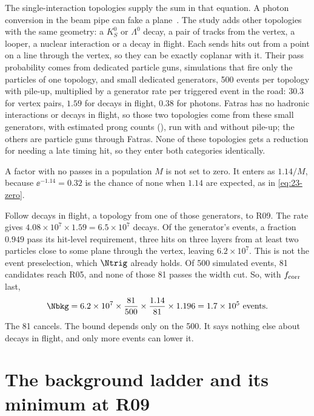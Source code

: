 The single-interaction topologies supply the sum in that equation. A photon conversion in the beam pipe can fake a plane~\cite{Knapen:2017kly}. The study adds other topologies with the same geometry: a $K^0_S$ or $\Lambda^0$ decay, a pair of tracks from the vertex, a looper, a nuclear interaction or a decay in flight. Each sends hits out from a point on a line through the vertex, so they can be exactly coplanar with it. Their pass probability comes from dedicated particle guns, simulations that fire only the particles of one topology, and small dedicated generators, 500 events per topology with pile-up, multiplied by a generator rate per triggered event in the road: $30.3$ for vertex pairs, $1.59$ for decays in flight, $0.38$ for photons. Fatras has no hadronic interactions or decays in flight, so those two topologies come from these small generators, with estimated prong counts (\EST), run with and without pile-up; the others are particle guns through Fatras. None of these topologies gets a reduction for needing a late timing hit, so they enter both categories identically.

A factor with no passes in a population $M$ is not set to zero. It enters as $1.14/M$, because $\ee^{-1.14}=0.32$ is the chance of none when $1.14$ are expected, as in \eqref{eq:23-zero}.

\begin{example}\label{exa:27-dif}
Follow decays in flight, a topology from one of those generators, to R09. The rate gives $4.08\times10^7\times1.59=6.5\times10^7$ decays. Of the generator's events, a fraction $0.949$ pass its hit-level requirement, three hits on three layers from at least two particles close to some plane through the vertex, leaving $6.2\times10^7$. This is not the event preselection, which $\Ntrig$ already holds. Of 500 simulated events, 81 candidates reach R05, and none of those 81 passes the width cut. So, with $f_{\rm corr}$ last,
\[
  \Nbkg=6.2\times10^7\times\frac{81}{500}\times\frac{1.14}{81}\times1.196=1.7\times10^5\ \text{events}.
\]
The 81 cancels. The bound depends only on the 500. It says nothing else about decays in flight, and only more events can lower it.
\end{example}

\section{The background ladder and its minimum at R09}\label{sec:27-ladder}

